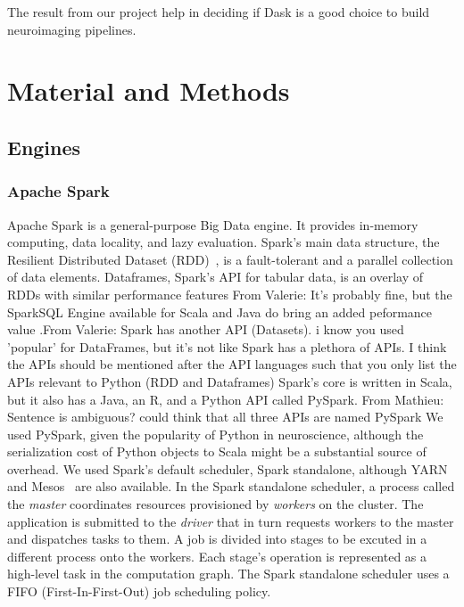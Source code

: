 \documentclass[conference]{IEEEtran}
\newcommand{\MD}[1]{\color{magenta}From Mathieu: #1 \color{black}}
\newcommand{\VHS}[1]{\color{green}From Valerie: #1 \color{black}}
\begin{document}
The result from our project help in deciding if Dask is a good choice to build
neuroimaging pipelines.


\section{Material and Methods}

\subsection{Engines}

\subsubsection{Apache Spark} Apache Spark is a general-purpose Big Data engine. It
provides in-memory computing, data locality, and lazy evaluation. Spark's main data
structure, the Resilient Distributed Dataset (RDD)~\cite{RDD}, is a fault-tolerant
and a parallel collection of data elements. Dataframes, Spark's API for tabular data,
is an overlay of RDDs with similar performance features \VHS{It's probably fine, but
the SparkSQL Engine available for Scala and Java do bring an added peformance
value}.\VHS{Spark has another API (Datasets). i know you used 'popular' for
DataFrames, but it's not like Spark has a plethora of APIs. I think the APIs should
be mentioned after the API languages such that you only list the APIs relevant to
Python (RDD and Dataframes)} Spark's core is written in Scala, but it also has a
Java, an R, and a Python API called PySpark. \MD{Sentence is ambiguous? could think
that all three APIs are named PySpark} We used PySpark, given the popularity of
Python in neuroscience, although the serialization cost of Python objects to Scala
might be a substantial source of overhead. We used Spark's default scheduler, Spark
standalone, although YARN~\cite{vavilapalli2013apache} and
Mesos~\cite{hindman2011mesos} are also available. In the Spark standalone scheduler,
a process called the \emph{master} coordinates resources provisioned by
\emph{workers} on the cluster. The application is submitted to the \emph{driver} that
in turn requests workers to the master and dispatches tasks to them. A job is divided
into stages to be excuted in a different process onto the workers. Each stage's
operation is represented as a high-level task in the computation graph. The Spark
standalone scheduler uses a FIFO (First-In-First-Out) job scheduling policy.
\end{document}
